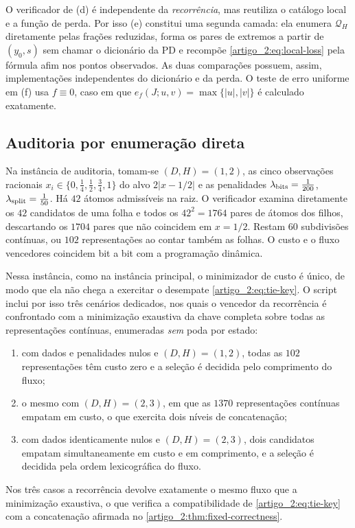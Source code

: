 O verificador de (d) é independente da \emph{recorrência}, mas reutiliza o
catálogo local e a função de perda. Por isso (e) constitui uma segunda camada:
ela enumera $\mathcal Q_H$ diretamente pelas frações reduzidas, forma os pares
de extremos a partir de $(y_0,s)$ sem chamar o dicionário da PD e recompõe
\eqref{artigo_2:eq:local-loss} pela fórmula afim nos pontos observados. As duas
comparações possuem, assim, implementações independentes do dicionário e da
perda. O teste de erro uniforme em (f) usa $f\equiv0$, caso em que
$e_f(J;u,v)=\max\{|u|,|v|\}$ é calculado exatamente.

\subsection{Auditoria por enumeração direta}

Na instância de auditoria, tomam-se $(D,H)=(1,2)$, as cinco observações
racionais $x_i\in\{0,\tfrac14,\tfrac12,\tfrac34,1\}$ do alvo $2|x-1/2|$ e as
penalidades $\lambda_{\rm bits}=\tfrac1{200}$,
$\lambda_{\rm split}=\tfrac1{50}$. Há $42$ átomos admissíveis na
raiz. O verificador examina diretamente os $42$ candidatos de uma folha e
todos os $42^2=1764$ pares de átomos dos filhos, descartando os $1704$ pares
que não coincidem em $x=1/2$. Restam $60$ subdivisões contínuas, ou $102$
representações ao contar também as folhas. O custo e o fluxo vencedores
coincidem bit a bit com a programação dinâmica.

Nessa instância, como na instância principal, o minimizador de custo é único,
de modo que ela não chega a exercitar o desempate \eqref{artigo_2:eq:tie-key}. O script
inclui por isso três cenários dedicados, nos quais o vencedor da recorrência é
confrontado com a minimização exaustiva da chave completa sobre todas as
representações contínuas, enumeradas \emph{sem} poda por estado:
\begin{enumerate}[label=(\alph*),leftmargin=2em]
 \item com dados e penalidades nulos e $(D,H)=(1,2)$, todas as $102$
 representações têm custo zero e a seleção é decidida pelo comprimento do
 fluxo;
 \item o mesmo com $(D,H)=(2,3)$, em que as $1370$ representações contínuas
 empatam em custo, o que exercita dois níveis de concatenação;
 \item com dados identicamente nulos e $(D,H)=(2,3)$, dois candidatos empatam
 simultaneamente em custo e em comprimento, e a seleção é decidida pela ordem
 lexicográfica do fluxo.
\end{enumerate}
Nos três casos a recorrência devolve exatamente o mesmo fluxo que a
minimização exaustiva, o que verifica a compatibilidade de \eqref{artigo_2:eq:tie-key}
com a concatenação afirmada no \cref{artigo_2:thm:fixed-correctness}.


